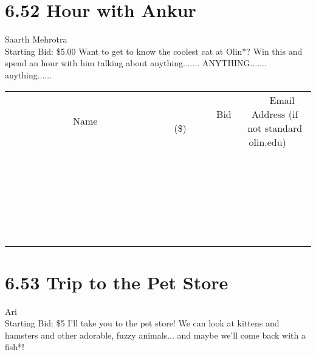 \documentclass[11pt]{article}
\begin{document}
\section*{6.52 Hour with Ankur}
Saarth Mehrotra
\\
Starting Bid: \$5.00
\newline
Want to get to know the coolest cat at Olin*? Win this and spend an hour with him talking about anything....... ANYTHING....... anything......
\\[6ex]
\begin{tabular}{c c c}
~~~~~~~~~~~~~Name~~~~~~~~~~~~~ & ~~~~~~~~~Bid (\$)~~~~~~~~~  & ~~~Email Address (if not standard olin.edu)~~~\\
 & & \\
\hline
 & & \\
\hline
 & & \\
\hline
 & & \\
\hline
 & & \\
\hline
 & & \\
\hline
 & & \\
\hline
 & & \\
\hline
 & & \\
\hline
 & & \\
\hline
 & & \\
\hline
 & & \\
\hline
 & & \\
\hline
 & & \\
\hline
 & & \\
\hline
 & & \\
\hline
 & & \\
\hline
 & & \\
\hline
 & & \\
\hline
 & & \\
\hline
 & & \\
\hline
 & & \\
\hline
 & & \\
\hline
 & & \\
\hline
 & & \\
\hline
 & & \\
\hline
\end{tabular}
\newpage
\section*{6.53 Trip to the Pet Store}
Ari
\\
Starting Bid: \$5
\newline
I'll take you to the pet store! We can look at kittens and hamsters and other adorable, fuzzy animals... and maybe we'll come back with a fish*!
\end{document}

